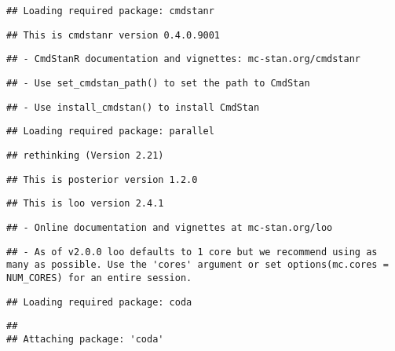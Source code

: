 \documentclass[
]{article}
\begin{document}
\begin{verbatim}
## Loading required package: cmdstanr
\end{verbatim}

\begin{verbatim}
## This is cmdstanr version 0.4.0.9001
\end{verbatim}

\begin{verbatim}
## - CmdStanR documentation and vignettes: mc-stan.org/cmdstanr
\end{verbatim}

\begin{verbatim}
## - Use set_cmdstan_path() to set the path to CmdStan
\end{verbatim}

\begin{verbatim}
## - Use install_cmdstan() to install CmdStan
\end{verbatim}

\begin{verbatim}
## Loading required package: parallel
\end{verbatim}

\begin{verbatim}
## rethinking (Version 2.21)
\end{verbatim}

\begin{verbatim}
## This is posterior version 1.2.0
\end{verbatim}

\begin{verbatim}
## This is loo version 2.4.1
\end{verbatim}

\begin{verbatim}
## - Online documentation and vignettes at mc-stan.org/loo
\end{verbatim}

\begin{verbatim}
## - As of v2.0.0 loo defaults to 1 core but we recommend using as many as possible. Use the 'cores' argument or set options(mc.cores = NUM_CORES) for an entire session.
\end{verbatim}

\begin{verbatim}
## Loading required package: coda
\end{verbatim}

\begin{verbatim}
## 
## Attaching package: 'coda'
\end{verbatim}
\end{document}

